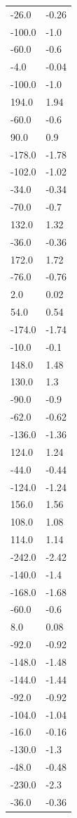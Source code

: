 \begin{longtable}{ll}
-26.0 & -0.26 \\
-100.0 & -1.0 \\
-60.0 & -0.6 \\
-4.0 & -0.04 \\
-100.0 & -1.0 \\
194.0 & 1.94 \\
-60.0 & -0.6 \\
90.0 & 0.9 \\
-178.0 & -1.78 \\
-102.0 & -1.02 \\
-34.0 & -0.34 \\
-70.0 & -0.7 \\
132.0 & 1.32 \\
-36.0 & -0.36 \\
172.0 & 1.72 \\
-76.0 & -0.76 \\
2.0 & 0.02 \\
54.0 & 0.54 \\
-174.0 & -1.74 \\
-10.0 & -0.1 \\
148.0 & 1.48 \\
130.0 & 1.3 \\
-90.0 & -0.9 \\
-62.0 & -0.62 \\
-136.0 & -1.36 \\
124.0 & 1.24 \\
-44.0 & -0.44 \\
-124.0 & -1.24 \\
156.0 & 1.56 \\
108.0 & 1.08 \\
114.0 & 1.14 \\
-242.0 & -2.42 \\
-140.0 & -1.4 \\
-168.0 & -1.68 \\
-60.0 & -0.6 \\
8.0 & 0.08 \\
-92.0 & -0.92 \\
-148.0 & -1.48 \\
-144.0 & -1.44 \\
-92.0 & -0.92 \\
-104.0 & -1.04 \\
-16.0 & -0.16 \\
-130.0 & -1.3 \\
-48.0 & -0.48 \\
-230.0 & -2.3 \\
-36.0 & -0.36 \\

\end{longtable}
